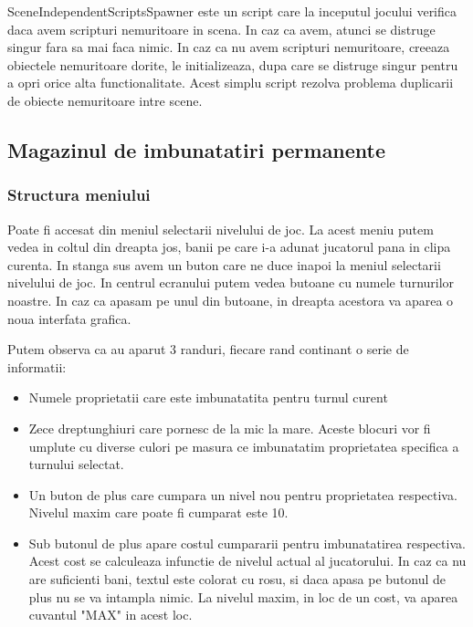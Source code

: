 \documentclass[12pt, a4paper]{article}
\begin{document}
	SceneIndependentScriptsSpawner este un script care la inceputul jocului verifica daca avem scripturi nemuritoare in scena. In caz ca avem, atunci se distruge singur fara sa mai faca nimic. In caz ca nu avem scripturi nemuritoare, creeaza obiectele nemuritoare dorite, le initializeaza, dupa care se distruge singur pentru a opri orice alta functionalitate. Acest simplu script rezolva problema duplicarii de obiecte nemuritoare intre scene.
	
	
	
	
	
	\subsection{Magazinul de imbunatatiri permanente}
	\label{section: permanentUpgrade}
	
	\subsubsection{Structura meniului}
	
	Poate fi accesat din meniul selectarii nivelului de joc. La acest meniu putem vedea in coltul din dreapta jos, banii pe care i-a adunat jucatorul pana in clipa curenta. In stanga sus avem un buton care ne duce inapoi la meniul selectarii nivelului de joc. In centrul ecranului putem vedea butoane cu numele turnurilor noastre. In caz ca apasam pe unul din butoane, in dreapta acestora va aparea o noua interfata grafica.
	\newline
	
	Putem observa ca au aparut 3 randuri, fiecare rand continant o serie de informatii:
	
	\begin{itemize}
		\item Numele proprietatii care este imbunatatita pentru turnul curent
		\item Zece dreptunghiuri care pornesc de la mic la mare. Aceste blocuri vor fi umplute cu diverse culori pe masura ce imbunatatim proprietatea specifica a turnului selectat.
		\item Un buton de plus care cumpara un nivel nou pentru proprietatea respectiva. Nivelul maxim care poate fi cumparat este 10.
		\item Sub butonul de plus apare costul cumpararii pentru imbunatatirea respectiva. Acest cost se calculeaza infunctie de nivelul actual al jucatorului. In caz ca nu are suficienti bani, textul este colorat cu rosu, si daca apasa pe butonul de plus nu se va intampla nimic. La nivelul maxim, in loc de un cost, va aparea cuvantul "MAX" in acest loc.
	\end{itemize}
	
\end{document}
